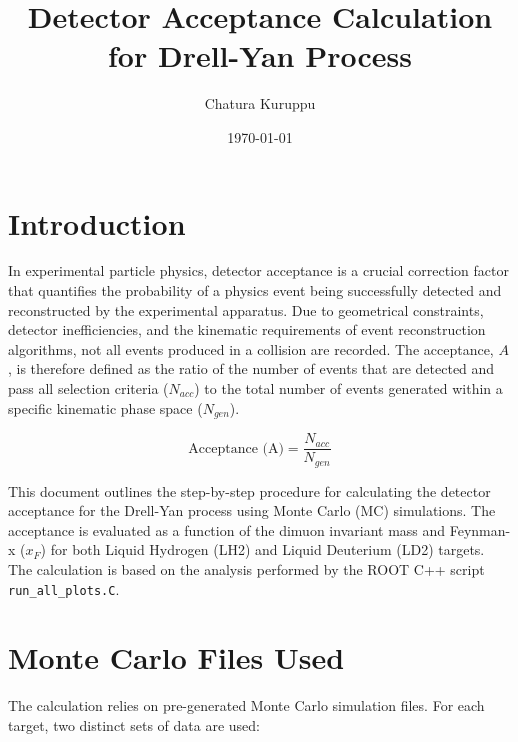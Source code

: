 \documentclass{article}
\begin{document}
\title{Detector Acceptance Calculation for Drell-Yan Process}
\author[1]{Chatura Kuruppu} 
\date{\today}
\maketitle

\section{Introduction}

In experimental particle physics, detector acceptance is a crucial correction factor that quantifies the probability of a physics event being successfully detected and reconstructed by the experimental apparatus. Due to geometrical constraints, detector inefficiencies, and the kinematic requirements of event reconstruction algorithms, not all events produced in a collision are recorded. The acceptance, $A$, is therefore defined as the ratio of the number of events that are detected and pass all selection criteria ($N_{acc}$) to the total number of events generated within a specific kinematic phase space ($N_{gen}$).

\begin{equation}
\text{Acceptance (A)} = \frac{N_{acc}}{N_{gen}}
\label{eq:acceptance}
\end{equation}

This document outlines the step-by-step procedure for calculating the detector acceptance for the Drell-Yan process using Monte Carlo (MC) simulations. The acceptance is evaluated as a function of the dimuon invariant mass and Feynman-x ($x_F$) for both Liquid Hydrogen (LH2) and Liquid Deuterium (LD2) targets. The calculation is based on the analysis performed by the ROOT C++ script \texttt{run\_all\_plots.C}.

\section{Monte Carlo Files Used}

The calculation relies on pre-generated Monte Carlo simulation files. For each target, two distinct sets of data are used:
\end{document}
